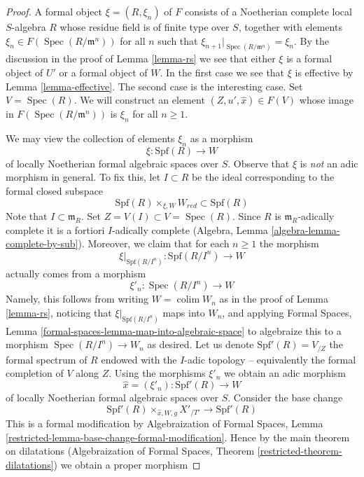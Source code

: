 \documentclass[10pt,a4paper]{amsart}
\theoremstyle{plain}
\theoremstyle{definition}
\theoremstyle{remark}
\numberwithin{equation}{subsection}
\def\colim{\mathop{\mathrm{colim}}\nolimits}
\def\Spec{\mathop{\mathrm{Spec}}}
\begin{document}
\begin{proof}
A formal object $\xi = (R, \xi_n)$ of $F$ consists of a Noetherian
complete local $S$-algebra $R$ whose residue field is of finite type
over $S$, together with elements $\xi_n \in F(\Spec(R/\mathfrak m^n))$
for all $n$ such that $\xi_{n + 1}|_{\Spec(R/\mathfrak m^n)} = \xi_n$.
By the discussion in the proof of Lemma \ref{lemma-rs}
we see that either $\xi$ is a formal object of $U'$ or a formal
object of $W$. In the first case we see that $\xi$ is effective
by Lemma \ref{lemma-effective}. The second case is the interesting case.
Set $V = \Spec(R)$. We will construct an element
$(Z, u', \hat x) \in F(V)$ whose image in $F(\Spec(R/\mathfrak m^n))$
is $\xi_n$ for all $n \geq 1$.

\medskip\noindent
We may view the collection of elements $\xi_n$ as a morphism
$$
\xi : \text{Spf}(R) \longrightarrow W
$$
of locally Noetherian formal algebraic spaces over $S$. Observe that $\xi$
is {\it not} an adic morphism in general. To fix this, let $I \subset R$
be the ideal corresponding to the formal closed subspace
$$
\text{Spf}(R) \times_{\xi, W} W_{red} \subset \text{Spf}(R)
$$
Note that $I \subset \mathfrak m_R$. Set $Z = V(I) \subset V = \Spec(R)$.
Since $R$ is $\mathfrak m_R$-adically complete it is a fortiori
$I$-adically complete (Algebra, Lemma \ref{algebra-lemma-complete-by-sub}).
Moreover, we claim that for each $n \geq 1$ the morphism
$$
\xi|_{\text{Spf}(R/I^n)} :
\text{Spf}(R/I^n)
\longrightarrow
W
$$
actually comes from a morphism
$$
\xi'_n :  \Spec(R/I^n) \longrightarrow W
$$
Namely, this follows from writing $W = \colim W_n$ as in the
proof of Lemma \ref{lemma-rs}, noticing that $\xi|_{\text{Spf}(R/I^n)}$
maps into $W_n$, and applying Formal Spaces, Lemma
\ref{formal-spaces-lemma-map-into-algebraic-space}
to algebraize this to a morphism $\Spec(R/I^n) \to W_n$
as desired. Let us denote $\text{Spf}'(R) = V_{/Z}$ the formal spectrum
of $R$ endowed with the $I$-adic topology -- equivalently the formal
completion of $V$ along $Z$. Using the morphisms
$\xi'_n$ we obtain an adic morphism
$$
\hat x = (\xi'_n) : \text{Spf}'(R) \longrightarrow W
$$
of locally Noetherian formal algebraic spaces over $S$.
Consider the base change
$$
\text{Spf}'(R) \times_{\hat x, W, g} X'_{/T'} \longrightarrow \text{Spf}'(R)
$$
This is a formal modification by
Algebraization of Formal Spaces, Lemma
\ref{restricted-lemma-base-change-formal-modification}.
Hence by the main theorem on dilatations
(Algebraization of Formal Spaces, Theorem \ref{restricted-theorem-dilatations})
we obtain a proper morphism

\end{proof}
\end{document}
